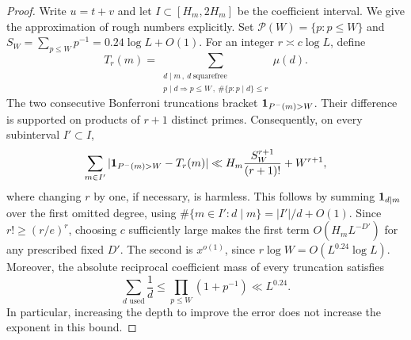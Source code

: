 \begin{proof}
Write $u=t+v$ and let $I\subset[H_m,2H_m]$ be the coefficient interval.
We give the approximation of rough numbers explicitly.  Set
$\mathcal P(W)=\{p:p\le W\}$ and
$S_W=\sum_{p\le W}p^{-1}=0.24\log L+O(1)$.
For an integer $r\asymp c\log L$, define
\[
 T_r(m)=\sum_{\substack{d\mid m\,,\ d\ \mathrm{squarefree}\\
                       p\mid d\Rightarrow p\le W\,,\ \#\{p:p\mid d\}\le r}}
             \mu(d).
\]
The two consecutive Bonferroni truncations bracket
$\mathbf{1}_{P^-(m)>W}$.  Their difference is supported on products of $r+1$
distinct primes.  Consequently, on every subinterval $I'\subset I$,
\begin{equation}\label{maj:rough-truncation}
 \sum_{m\in I'}|\mathbf{1}_{P^-(m)>W}-T_r(m)|
 \ll H_m\frac{S_W^{r+1}}{(r+1)!}+W^{r+1},
\end{equation}
where changing $r$ by one, if necessary, is harmless.  This follows
by summing $\mathbf{1}_{d\mid m}$ over the first omitted degree, using
$\#\{m\in I':d\mid m\}=|I'|/d+O(1)$.  Since
$r!\ge(r/e)^r$, choosing $c$ sufficiently large makes the first
term $O(H_mL^{-D'})$ for any prescribed fixed $D'$.  The second is
$x^{o(1)}$, since $r\log W=O(L^{0.24}\log L)$.  Moreover, the
absolute reciprocal coefficient mass of every truncation satisfies
\begin{equation}\label{maj:rough-reciprocal}
 \sum_{d\text{ used}}\frac1d
 \le\prod_{p\le W}(1+p^{-1})\ll L^{0.24}.
\end{equation}
In particular, increasing the depth to improve the error does not
increase the exponent in this bound.


\end{proof}
